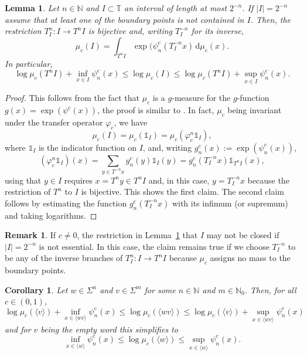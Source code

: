 \documentclass[11pt,reqno]{amsart}
\theoremstyle{plain}
\newtheorem{lemma}[theorem]{Lemma}
\newtheorem{coro}[theorem]{Corollary}
\theoremstyle{definition}
\newtheorem{remark}[theorem]{Remark}
\newcommand{\N}{{\mathbb N}}
\newcommand{\dd}{\,\mathrm{d}}
\begin{document}
\begin{lemma}
\label{LEM:mu-on-interval}
Let $n \in \N$ and $I \subset \mathbb{T}$ an interval of length at most $2^{-n}$. If $|I| = 2^{-n}$ assume that at least one of the boundary points is not contained in $I$.  Then, the restriction $T_I^n \colon I \to T^n I$ is bijective and, writing $T_I^{-n}$ for its inverse,
\[
\mu_c(I) = \int_{T^n I} \exp(\psi_n^c(T_I^{-n}x) \dd \mu_c(x).
\]
In particular,
\[
\log \mu_c(T^n I) + \inf_{x \in I} \psi_n^c(x)
\leqslant \log \mu_c(I)
\leqslant \log \mu_c(T^n I) + \sup_{x \in I} \psi_n^c(x).
\]
\end{lemma}

\begin{proof}
This follows from the fact that $\mu_{c}$ is a $g$-measure for the $g$-function $g(x) = \exp(\psi^c(x))$, the proof is similar to \cite[Prop.~6.1.14]{gohlke}. In fact, $\mu_{c}$ being invariant under the transfer operator $\varphi_{c}$, we have
\[
\mu_c(I) = \mu_c(\mathds{1}_I) = \mu_c(\varphi_c^n \mathds{1}_I),
\]
where $\mathds{1}_I$ is the indicator function on $I$,
and, writing $g_n^{c}(x) := \exp(\psi_n^c(x))$,
\[
(\varphi_c^n \mathds{1}_I)(x)
= \sum_{y \in T^{-n}x} g_n^{c}(y) \mathds{1}_I(y)
= g_n^{c}(T_I^{-n} x) \mathds{1}_{T^n I}(x),
\]
using that $y \in I$ requires $x = T^n y \in T^n I$ and, in this case, $y = T_I^{-n} x$ because the restriction of $T^n$ to $I$ is bijective. This shows the first claim. The second claim follows by estimating the function $g_n^{c}(T^{-n}_Ix)$ with its infimum (or supremum) and taking logarithms.
\end{proof}

\begin{remark}
If $c \neq 0$, the restriction in Lemma~\ref{LEM:mu-on-interval} that $I$ may not be closed if $|I|=2^{-n}$ is not essential. In this case, the claim remains true if we choose $T^{-n}_I$ to be any of the inverse branches of $T_I^n \colon I \to T^n I$ because $\mu_c$ assigns no mass to the boundary points.
\end{remark} 

\begin{coro}
\label{COR:mu-on-double-word}
Let $w \in \Sigma^n$ and $v \in \Sigma^m$ for some $n \in \N$ and $m \in \N_0$. Then, for all $c \in (0,1)$, 
\[
\log \mu_{c}(\langle v\rangle) + \inf_{x \in \langle wv\rangle}  \psi^c_n(x)
\leqslant \log \mu_{c}(\langle wv\rangle) 
\leqslant \log \mu_{c}(\langle v\rangle) + \sup_{x \in \langle wv\rangle} \psi^c_n(x)
\]
and for $v$ being the empty word this simplifies to 
\[
\inf_{x \in \langle w\rangle} \psi^c_n(x)
\leqslant \log \mu_{c}(\langle w\rangle) 
\leqslant \sup_{x \in \langle w\rangle} \psi^c_n(x).
\]
\end{coro}
\end{document}
